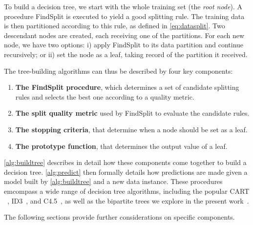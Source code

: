 To build a decision tree, we start with the whole training set (the \emph{root node}). A procedure FindSplit is executed to yield a good splitting rule.
The training data is then partitioned according to this rule, as defined in \autoref{eq:datasplit}. Two descendant nodes are created, each receiving one of the partitions.
For each new node, we have two options: i) apply FindSplit to its data partition and continue recursively; or ii) set the node as a leaf, taking record of the partition it received.

The tree-building algorithms can thus be described by four key components:
%
\begin{enumerate}
    \item \textbf{The FindSplit procedure}, which determines a set of candidate splitting rules and selects the best one according to a quality metric.
    \item \textbf{The split quality metric} used by FindSplit to evaluate the candidate rules.
    \item \textbf{The stopping criteria}, that determine when a node should be set as a leaf.
    \item \textbf{The prototype function}, that determines the output value of a leaf.
\end{enumerate}
%
\autoref{alg:buildtree} describes in detail how these components come together to build a decision tree. \autoref{alg:predict} then formally details how predictions are made given a model built by \autoref{alg:buildtree} and a new data instance.
%
These procedures emcompass a wide range of decision tree algorithms, including the popular CART ~\cite{breiman1984classification}, ID3~\cite{quinlan1986induction}, and C4.5~\cite{quinlan2014c4}, as well as the bipartite trees we explore in the present work~\cite{pliakos2018global}.  %

The following sections provide further considerations on specific components.

\algPredict
\algBuildTree


